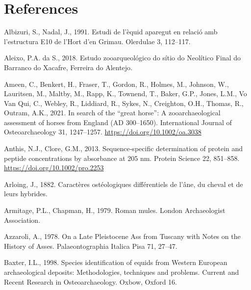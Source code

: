 \documentclass[preprint, 3p, authoryear]{elsarticle} %
\newlength{\cslhangindent}
\newlength{\cslentryspacingunit} %
\newenvironment{CSLReferences}[2] %
 {%
  \setlength{\parindent}{0pt}
  \ifodd #1
  \let\oldpar\par
  \def\par{\hangindent=\cslhangindent\oldpar}
  \fi
  \setlength{\parskip}{#2\cslentryspacingunit}
 }%
 {}
\begin{document}
\hypertarget{references}{%
\section*{References}\label{references}}

\hypertarget{refs}{}
\begin{CSLReferences}{1}{0}
\leavevmode{}%
Albizuri, S., Nadal, J., 1991. Estudi de l'èquid aparegut en relació amb l'estructura {E10} de l'{Hort} d'en {Grimau}. Olerdulae 3, 112--117.

\leavevmode{}%
Aleixo, P.A. da S., 2018. Estudo zooarqueológico do sítio do {Neolítico Final} do {Barranco} do {Xacafre}, {Ferreira} do {Alentejo}.

\leavevmode{}%
Ameen, C., Benkert, H., Fraser, T., Gordon, R., Holmes, M., Johnson, W., Lauritsen, M., Maltby, M., Rapp, K., Townend, T., Baker, G.P., Jones, L.M., Vo Van Qui, C., Webley, R., Liddiard, R., Sykes, N., Creighton, O.H., Thomas, R., Outram, A.K., 2021. In search of the {``great horse''}: {A} zooarchaeological assessment of horses from {England} ({AD} 300--1650). International Journal of Osteoarchaeology 31, 1247--1257. \url{https://doi.org/10.1002/oa.3038}

\leavevmode{}%
Anthis, N.J., Clore, G.M., 2013. Sequence‐specific determination of protein and peptide concentrations by absorbance at 205 nm. Protein Science 22, 851--858. \url{https://doi.org/10.1002/pro.2253}

\leavevmode{}%
Arloing, J., 1882. Caractères ostéologiques différentiels de l'âne, du cheval et de leurs hybrides.

\leavevmode{}%
Armitage, P.L., Chapman, H., 1979. Roman mules. {London Archaeologist Association}.

\leavevmode{}%
Azzaroli, A., 1978. On a {Late Pleistocene Ass} from {Tuscany}\textbar{} with {Notes} on the {History} of {Asses}. Palaeontographia Italica Pisa 71, 27--47.

\leavevmode{}%
Baxter, I.L., 1998. Species identification of equids from {Western European} archaeological deposits: Methodologies, techniques and problems. Current and Recent Research in Osteoarchaeology. Oxbow, Oxford 16.


\end{CSLReferences}
\end{document}
